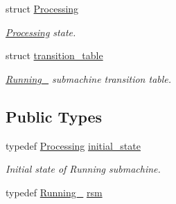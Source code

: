\begin{DoxyCompactItemize}
struct \hyperlink{structmdt_usbtmc_transfer_handler_state_machine_1_1_running___1_1_processing}{Processing}
\begin{DoxyCompactList}\small\item\em \hyperlink{structmdt_usbtmc_transfer_handler_state_machine_1_1_running___1_1_processing}{Processing} state. \end{DoxyCompactList}\item 
struct \hyperlink{structmdt_usbtmc_transfer_handler_state_machine_1_1_running___1_1transition__table}{transition\-\_\-table}
\begin{DoxyCompactList}\small\item\em \hyperlink{structmdt_usbtmc_transfer_handler_state_machine_1_1_running__}{Running\-\_\-} submachine transition table. \end{DoxyCompactList}\end{DoxyCompactItemize}
\subsection*{Public Types}
\begin{DoxyCompactItemize}
\item 
typedef \hyperlink{structmdt_usbtmc_transfer_handler_state_machine_1_1_running___1_1_processing}{Processing} \hyperlink{structmdt_usbtmc_transfer_handler_state_machine_1_1_running___a518a24b7247d03bb8790c6df63c3cd0e}{initial\-\_\-state}
\begin{DoxyCompactList}\small\item\em Initial state of Running submachine. \end{DoxyCompactList}\item 
typedef \hyperlink{structmdt_usbtmc_transfer_handler_state_machine_1_1_running__}{Running\-\_\-} \hyperlink{structmdt_usbtmc_transfer_handler_state_machine_1_1_running___a1166c4cb073ea7aceda7c9e98be4f7db}{rsm}
\end{DoxyCompactItemize}
